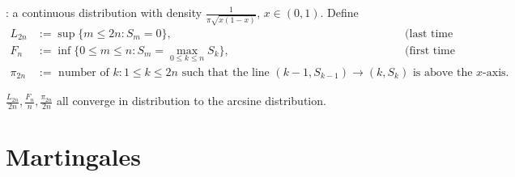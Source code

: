 \documentclass[10pt,a4paper]{article}
\begin{document}
\noindent {}: a continuous distribution with density $\frac1{\pi\sqrt{x(1-x)}}$, $x\in(0,1)$. Define 
\begin{align*}
	L_{2n}&:=\sup\{m\leq2n:S_m=0\}, &\text{(last time at 0)}\\
	F_n&:=\inf\{0\leq m\leq n:S_m=\max\limits_{0\leq k\leq n}S_k\},&\text{(first time at maximum)}\\
	\pi_{2n}&:=\text{ number of } k:1\leq k\leq2n \text{ such that the line } (k-1,S_{k-1})\to(k,S_k) \text{ is above the $x$-axis}.
\end{align*}

\begin{thmbox}
	\begin{theorem}\label{thm:ArcsineLaw}
		$\frac{L_{2n}}{2n},\frac{F_n}n,\frac{\pi_{2n}}{2n}$ all converge in distribution to the arcsine distribution.
	\end{theorem}
\end{thmbox}

\section{Martingales}\label{sec:martingales}
\end{document}

